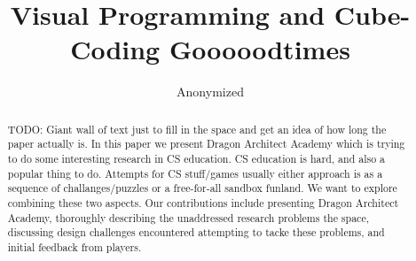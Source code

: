 \documentclass{sig-alternate}
\newcommand{\TODO}[1]{{\color{red} TODO: #1}}
\newcommand{\gametitle}{{\color{RoyalPurple} Dragon Architect Academy}}
\begin{document}
%

\title{Visual Programming and Cube-Coding Gooooodtimes}

\author{Anonymized}


\maketitle
\begin{abstract}
    \TODO{Giant wall of text just to fill in the space and get an idea of how long the paper actually is. In this paper we present \gametitle{} which is trying to do some interesting research in CS education. CS education is hard, and also a popular thing to do. Attempts for CS stuff/games usually either approach is as a sequence of challanges/puzzles or a free-for-all sandbox funland. We want to explore combining these two aspects. Our contributions include presenting \gametitle{}, thoroughly describing the unaddressed research problems the space, discussing design challenges encountered attempting to tacke these problems, and initial feedback from players.}
\end{abstract}



\end{document}
